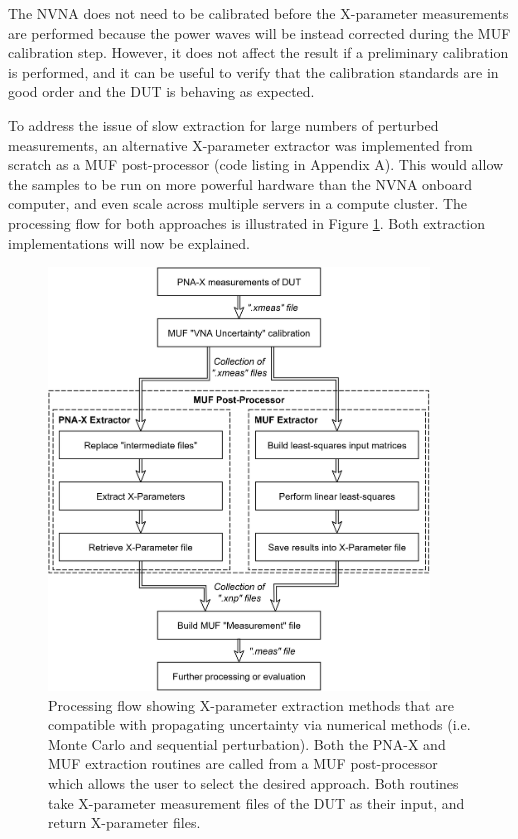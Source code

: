 \documentclass[../thesis/thesis.tex]{subfiles}
\begin{document}
The NVNA does not need to be calibrated before the X-parameter measurements are performed because the power waves will be instead corrected during the MUF calibration step. However, it does not affect the result if a preliminary calibration is performed, and it can be useful to verify that the calibration standards are in good order and the DUT is behaving as expected.

To address the issue of slow extraction for large numbers of perturbed measurements, an alternative  X-parameter extractor was implemented from scratch as a MUF post-processor (code listing in Appendix A). This would allow the samples to be run on more powerful hardware than the NVNA onboard computer, and even scale across multiple servers in a compute cluster. The processing flow for both approaches is illustrated in Figure \ref{ch5_fig_uncproc}. Both extraction implementations will now be explained.

\begin{figure}
	\centering
	\includegraphics[width=0.9\textwidth]{uncproc}
	\caption[X-parameter uncertainty processing flow.]{Processing flow showing X-parameter extraction methods that are compatible with propagating uncertainty via numerical methods (i.e. Monte Carlo and sequential perturbation). Both the PNA-X and MUF extraction routines are called from a MUF post-processor which allows the user to select the desired approach. Both routines take X-parameter measurement files of the DUT as their input, and return X-parameter files.}
	\label{ch5_fig_uncproc}
\end{figure}
\end{document}
